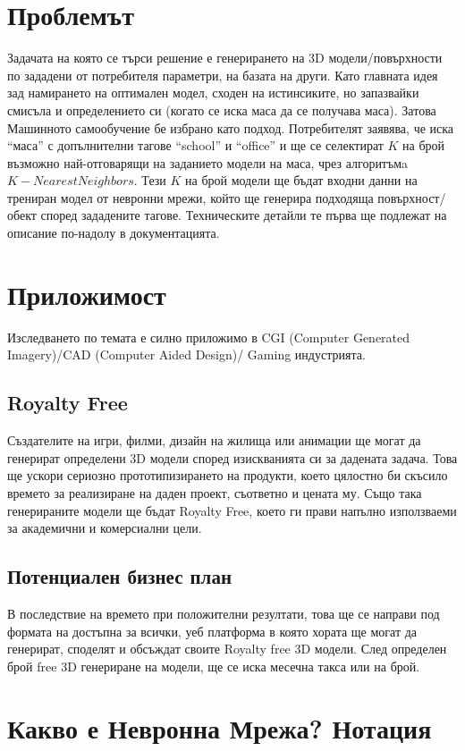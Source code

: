 \section{Проблемът}
Задачата на която се търси решение е генерирането на 3D модели/повърхности по зададени от потребителя параметри, на базата на други. Като главната идея зад намирането на оптимален модел, сходен на истинсиките, но запазвайки смисъла и определението си (когато се иска маса да се получава маса). Затова Машинното самообучение бе избрано като подход. Потребителят заявява, че иска ``маса'' с допълнителни тагове ``school'' и ``office'' и ще се селектират $K$ на брой възможно най-отговарящи на заданието модели на маса, чрез алгоритъмa $K-Nearest Neighbors$. Тези $K$ на брой модели ще бъдат входни данни на трениран модел от невронни мрежи, който ще генерира подходяща повърхност/обект според зададените тагове. Техническите детайли те първа ще подлежат на описание по-надолу в документацията.
\section{Приложимост}

Изследването по темата е силно приложимо в CGI (Computer Generated Imagery)/CAD (Computer Aided Design)/ Gaming индустрията.

\subsection{Royalty Free}
Създателите на игри, филми, дизайн на жилища или анимации ще могат да генерират определени 3D модели според изискванията си за дадената задача. Това ще ускори сериозно прототипизирането на продукти, което цялостно би скъсило времето за реализиране на даден проект, съответно и цената му. Също така генерираните модели ще бъдат Royalty Free, което ги прави напълно използваеми за академични и комерсиални цели.

\subsection{Потенциален бизнес план}
В последствие на времето при положителни резултати, това ще се направи под формата на достъпна за всички, уеб платформа в която хората ще могат да генерират, споделят и обсъждат своите Royalty free 3D модели. След определен брой free 3D генериране на модели, ще се иска месечна такса или на брой.

\section{Какво е Невронна Мрежа? Нотация}

